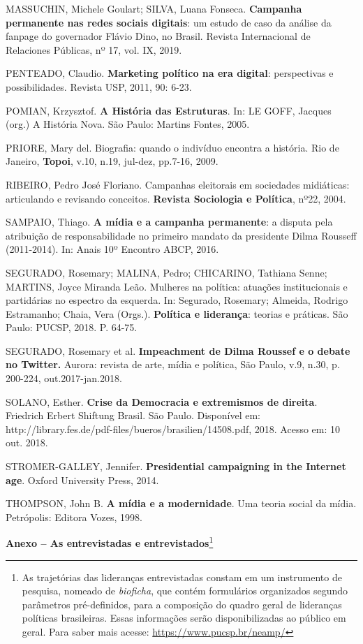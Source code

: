 MASSUCHIN, Michele Goulart; SILVA, Luana Fonseca. \textbf{Campanha
permanente nas redes sociais digitais}: um estudo de caso da análise da
fanpage do governador Flávio Dino, no Brasil. Revista Internacional de
Relaciones Públicas, nº 17, vol. IX, 2019.

PENTEADO, Claudio. \textbf{Marketing político na era digital}:
perspectivas e possibilidades. Revista USP, 2011, 90: 6-23.

POMIAN, Krzysztof. \textbf{A História das Estruturas}. In: LE GOFF,
Jacques (org.) A História Nova. São Paulo: Martins Fontes, 2005.

PRIORE, Mary del. Biografia: quando o indivíduo encontra a história. Rio
de Janeiro, \textbf{Topoi}, v.10, n.19, jul-dez, pp.7-16, 2009.

RIBEIRO, Pedro José Floriano. Campanhas eleitorais em sociedades
midiáticas: articulando e revisando conceitos. \textbf{Revista
Sociologia e Política}, nº22, 2004.

SAMPAIO, Thiago. \textbf{A mídia e a campanha permanente}: a disputa
pela atribuição de responsabilidade no primeiro mandato da presidente
Dilma Rousseff (2011-2014). In: Anais 10º Encontro ABCP, 2016.

SEGURADO, Rosemary; MALINA, Pedro; CHICARINO, Tathiana Senne; MARTINS,
Joyce Miranda Leão. Mulheres na política: atuações institucionais e
partidárias no espectro da esquerda. In: Segurado, Rosemary; Almeida,
Rodrigo Estramanho; Chaia, Vera (Orgs.). \textbf{Política e liderança}:
teorias e práticas. São Paulo: PUCSP, 2018. P. 64-75.

SEGURADO, Rosemary et al. \textbf{Impeachment de Dilma Roussef e o
debate no Twitter.} Aurora: revista de arte, mídia e política, São
Paulo, v.9, n.30, p. 200-224, out.2017-jan.2018.

SOLANO, Esther. \textbf{Crise da Democracia e extremismos de direita}.
Friedrich Erbert Shiftung Brasil. São Paulo. Disponível em:
http://library.fes.de/pdf-files/bueros/brasilien/14508.pdf, 2018. Acesso
em: 10 out. 2018.

STROMER-GALLEY, Jennifer. \textbf{Presidential campaigning in the
Internet age}. Oxford University Press, 2014.

THOMPSON, John B. \textbf{A mídia e a modernidade}. Uma teoria social da
mídia. Petrópolis: Editora Vozes, 1998.

\textbf{Anexo -- As entrevistadas e entrevistados}\footnote{As
  trajetórias das lideranças entrevistadas constam em um instrumento de
  pesquisa, nomeado de \emph{bioficha}, que contém formulários
  organizados segundo parâmetros pré-definidos, para a composição do
  quadro geral de lideranças políticas brasileiras. Essas informações
  serão disponibilizadas ao público em geral. Para saber mais acesse:
  \url{https://www.pucsp.br/neamp/}}

